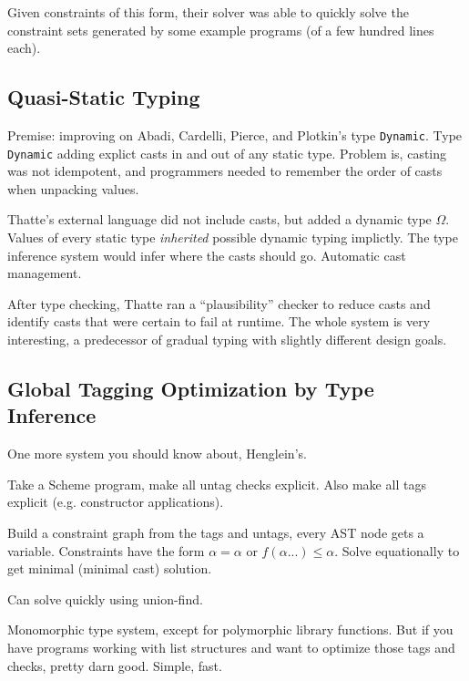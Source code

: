 \documentclass{article}
\begin{document}
Given constraints of this form, their solver was able to quickly solve
 the constraint sets generated by some example programs (of a few hundred lines
 each).

\subsection*{Quasi-Static Typing}
\label{sec:t-popl-1990}

Premise: improving on Abadi, Cardelli, Pierce, and Plotkin's type {\tt Dynamic}.
Type {\tt Dynamic} adding explict casts in and out of any static type.
Problem is, casting was not idempotent, and programmers needed to remember
 the order of casts when unpacking values.

Thatte's external language did not include casts, but added a dynamic type $\Omega$.
Values of every static type \emph{inherited} possible dynamic typing implictly.
The type inference system would infer where the casts should go.
Automatic cast management.

After type checking, Thatte ran a ``plausibility'' checker to reduce casts
 and identify casts that were certain to fail at runtime.
The whole system is very interesting, a predecessor of gradual typing with
 slightly different design goals.


\subsection*{Global Tagging Optimization by Type Inference}
\label{sec:h-lfp-1992}

One more system you should know about, Henglein's.

Take a Scheme program, make all untag checks explicit.
Also make all tags explicit (e.g. constructor applications).

Build a constraint graph from the tags and untags, every AST node gets a variable.
Constraints have the form $\alpha = \alpha$ or $f(\alpha ...) \le \alpha$.
Solve equationally to get minimal (minimal cast) solution.

Can solve quickly using union-find.

Monomorphic type system, except for polymorphic library functions.
But if you have programs working with list structures and want to optimize those
 tags and checks, pretty darn good.
Simple, fast.
\end{document}

